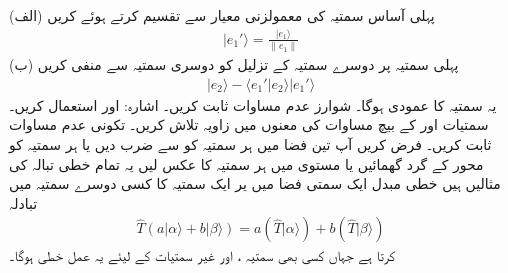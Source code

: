 (الف) پہلی آساس سمتیہ کی معمولزنی معیار سے تقسیم کرتے ہوئے کریں
\begin{align*}
		|e_1'\rangle = \frac{|e_1\rangle}{\|e_1\|}
\end{align*}
(ب) پہلی سمتیہ پر دوسرے سمتیہ کے تزلیل کو دوسری سمتیہ سے منفی کریں
\begin{align*}
	|e_2\rangle-\langle e_1'|e_2\rangle|e_1'\rangle
\end{align*}
یہ سمتیہ  کا عمودی ہوگا۔
شوارز عدم مساوات ثابت کریں۔ اشارہ:  اور  استعمال کریں۔
سمتیات  اور  کے بیچ مساوات  کی معنوں میں زاویہ تلاش کریں۔
تکونی عدم مساوات  ثابت کریں۔
فرض کریں آپ تین فضا میں ہر سمتیہ کو  سے ضرب دیں یا ہر سمتیہ کو  محور کے گرد  گھمائیں یا  مستوی میں ہر سمتیہ کا عکس لیں یہ تمام خطی تبالہ کی مثالیں ہیں خطی مبدل  ایک سمتی فضا میں یر ایک سمتیہ کا کسی دوسرے سمتیہ  میں تبادلہ
\begin{align}
	\hat{T}(a|\alpha\rangle+b|\beta\rangle)=a(\hat{T}|\alpha\rangle)+b(\hat{T}|\beta\rangle)
\end{align}
کرتا ہے جہاں کسی بھی سمتیہ ،  اور غیر سمتیات  کے لیئے یہ عمل خطی ہوگا۔

